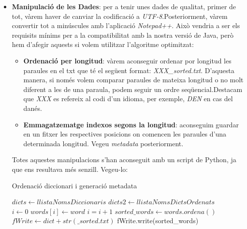\documentclass[conference]{IEEEtran}
\begin{document}
        \begin{itemize}
            \item \textbf{Manipulació de les Dades}: per a tenir unes dades de qualitat, primer de tot, vàrem haver de canviar la codificació a \textit{UTF-8}.Posteriorment, vàrem convertir tot a minúscules amb l'aplicació \textit{Notepad++}. Això vendria a ser els requisits mínims per a la compatibilitat amb la nostra versió de Java, però hem d'afegir aquests si volem utilitzar l'algoritme optimitzat:

            \begin{itemize}
                \item \textbf{Ordenació per longitud}: vàrem aconseguir ordenar por longitud les paraules en el txt que té el següent format: \textit{XXX\_sorted.txt}. D'aquesta manera, si només volem comparar paraules de mateixa longitud o no molt diferent a les de una paraula, podem seguir un ordre seqüencial.Destacam que \textit{XXX} es refereix al codi d'un idioma, per exemple, \textit{DEN} en cas del danés.\\

                \item \textbf{Emmagatzematge indexos segons la longitud}: aconseguim guardar en un fitxer les respectives posicions on comencen les paraules d'una determinada longitud. Vegeu \textit{metadata} posteriorment.
            \end{itemize}

            Totes aquestes manipulacions s'han aconseguit amb un script de Python, ja que ens resultava més senzill. Vegeu-lo:\\

                \begin{algorithm}
                    \caption{Ordenació diccionari i generació metadata}
                    \begin{algorithmic}[1]
                        \State $dicts  \gets llistaNomsDiccionaris$
                        \State $dicts2 \gets llistaNomsDictsOrdenats$\\

                                \State $i\gets 0$
                                    \State $words[i]\gets word$
                                    \State $i=i+1$
                                \EndFor
                                \State $sorted\_words \gets words.ordena()$
                                \State $fWrite \gets dict+str(\_sorted.txt)$
                                \State fWrite.write(sorted\_words)
                    \EndFor\\\\


\end{algorithmic}
\end{algorithm}
\end{itemize}
\end{document}
